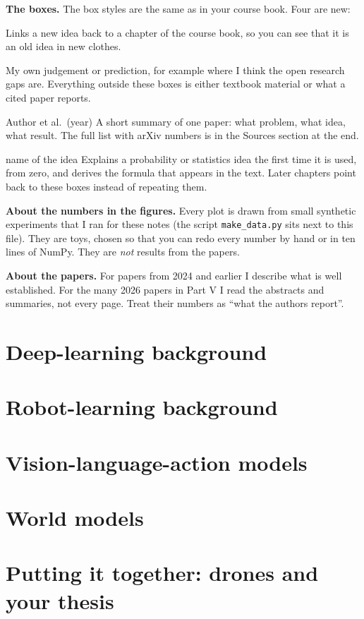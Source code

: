 \documentclass[11pt,a4paper]{article}
\begin{document}
\textbf{The boxes.} The box styles are the same as in your course book. Four are new:
\begin{bridgebox}
Links a new idea back to a chapter of the course book, so you can see that it is an old idea in new clothes.
\end{bridgebox}
\begin{opinionbox}
My own judgement or prediction, for example where I think the open research gaps are. Everything outside these boxes is either textbook material or what a cited paper reports.
\end{opinionbox}
\begin{paperbox}{Author et al.\ (year)}
A short summary of one paper: what problem, what idea, what result. The full list with arXiv numbers is in the Sources section at the end.
\end{paperbox}
\begin{probbox}{name of the idea}
Explains a probability or statistics idea the first time it is used, from zero, and derives the formula that appears in the text. Later chapters point back to these boxes instead of repeating them.
\end{probbox}

\textbf{About the numbers in the figures.} Every plot is drawn from small synthetic experiments that I ran for these notes (the script \texttt{make\_data.py} sits next to this file). They are toys, chosen so that you can redo every number by hand or in ten lines of NumPy. They are \emph{not} results from the papers.

\textbf{About the papers.} For papers from 2024 and earlier I describe what is well established. For the many 2026 papers in Part V I read the abstracts and summaries, not every page. Treat their numbers as ``what the authors report''.

\part{Deep-learning background}

\part{Robot-learning background}

\part{Vision-language-action models}

\part{World models}

\part{Putting it together: drones and your thesis}

\end{document}
